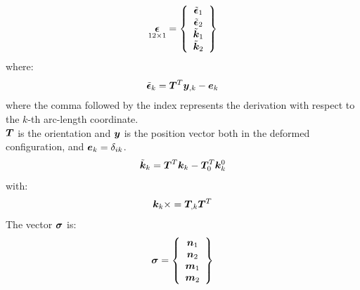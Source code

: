 \begin{equation}
\underset{ 12 \times 1 }{
 \T{\epsilon}
 } =
\cubr{\vvect{c}{
 \tilde{\T{\epsilon}}_1 \\
 \tilde{\T{\epsilon}}_2 \\
 \tilde{\T{k} }_1 \\
 \tilde{\T{k} }_2 \\
}}
\end{equation}
where:
\begin{equation}
\tilde{\T{\epsilon}}_k =
\T{T} ^T \T{y}_{,k}  - \T{e}_k
\label{eq:epsilon}
\end{equation}
where the comma followed by the index represents the derivation with respect to the $k$-th arc-length coordinate.\\
$\T{T}$ is the orientation and $\T{y}$ is the position vector both in the deformed configuration, and
$\T{e}_k=\delta_{ik}$.
\begin{equation}
\tilde{\T{k}}_k  =
\T{T}^ T \T{k}_k  - \T{T}_0 ^ T  \T{k}^{0}_{k}
\end{equation}
with:
\begin{equation}
\T{k}_k  \times = \T{T}_{,k} \T{T}^T
\end{equation}
The vector $\T{\sigma}$ is:
\begin{equation}
 \T{\sigma} =
\cubr{\vvect{c}{
 \T{n}_1 \\
 \T{n}_2 \\
 \T{m}_1 \\
 \T{m}_2 \\
}}
\end{equation}
